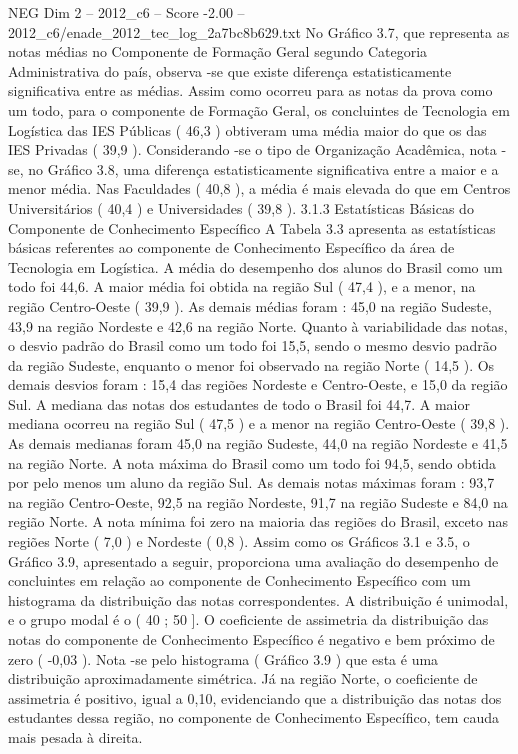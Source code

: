 \begin{textsample}{NEG Dim 2 – 2012\_c6 – Score -2.00 – 2012\_c6/enade\_2012\_tec\_log\_2a7bc8b629.txt}
No Gráfico 3.7, que representa as notas médias no Componente de Formação Geral segundo Categoria Administrativa do país, observa -se que existe diferença estatisticamente significativa entre as médias.
Assim como ocorreu para as notas da prova como um todo, para o componente de Formação Geral, os concluintes de Tecnologia em Logística das IES Públicas ( 46,3 ) obtiveram uma média maior do que os das IES Privadas ( 39,9 ).
Considerando -se o tipo de Organização Acadêmica, nota -se, no Gráfico 3.8, uma diferença estatisticamente significativa entre a maior e a menor média.
Nas Faculdades ( 40,8 ), a média é mais elevada do que em Centros Universitários ( 40,4 ) e Universidades ( 39,8 ). 3.1.3 Estatísticas Básicas do Componente de Conhecimento Específico A Tabela 3.3 apresenta as estatísticas básicas referentes ao componente de Conhecimento Específico da área de Tecnologia em Logística.
A média do desempenho dos alunos do Brasil como um todo foi 44,6.
A maior média foi obtida na região Sul ( 47,4 ), e a menor, na região Centro-Oeste ( 39,9 ).
As demais médias foram : 45,0 na região Sudeste, 43,9 na região Nordeste e 42,6 na região Norte.
Quanto à variabilidade das notas, o desvio padrão do Brasil como um todo foi 15,5, sendo o mesmo desvio padrão da região Sudeste, enquanto o menor foi observado na região Norte ( 14,5 ).
Os demais desvios foram : 15,4 das regiões Nordeste e Centro-Oeste, e 15,0 da região Sul.
A mediana das notas dos estudantes de todo o Brasil foi 44,7.
A maior mediana ocorreu na região Sul ( 47,5 ) e a menor na região Centro-Oeste ( 39,8 ).
As demais medianas foram 45,0 na região Sudeste, 44,0 na região Nordeste e 41,5 na região Norte.
A nota máxima do Brasil como um todo foi 94,5, sendo obtida por pelo menos um aluno da região Sul.
As demais notas máximas foram : 93,7 na região Centro-Oeste, 92,5 na região Nordeste, 91,7 na região Sudeste e 84,0 na região Norte.
A nota mínima foi zero na maioria das regiões do Brasil, exceto nas regiões Norte ( 7,0 ) e Nordeste ( 0,8 ).
Assim como os Gráficos 3.1 e 3.5, o Gráfico 3.9, apresentado a seguir, proporciona uma avaliação do desempenho de concluintes em relação ao componente de Conhecimento Específico com um histograma da distribuição das notas correspondentes.
A distribuição é unimodal, e o grupo modal é o ( 40 ; 50 ].
O coeficiente de assimetria da distribuição das notas do componente de Conhecimento Específico é negativo e bem próximo de zero ( -0,03 ).
Nota -se pelo histograma ( Gráfico 3.9 ) que esta é uma distribuição aproximadamente simétrica.
Já na região Norte, o coeficiente de assimetria é positivo, igual a 0,10, evidenciando que a distribuição das notas dos estudantes dessa região, no componente de Conhecimento Específico, tem cauda mais pesada à direita.

\end{textsample}
